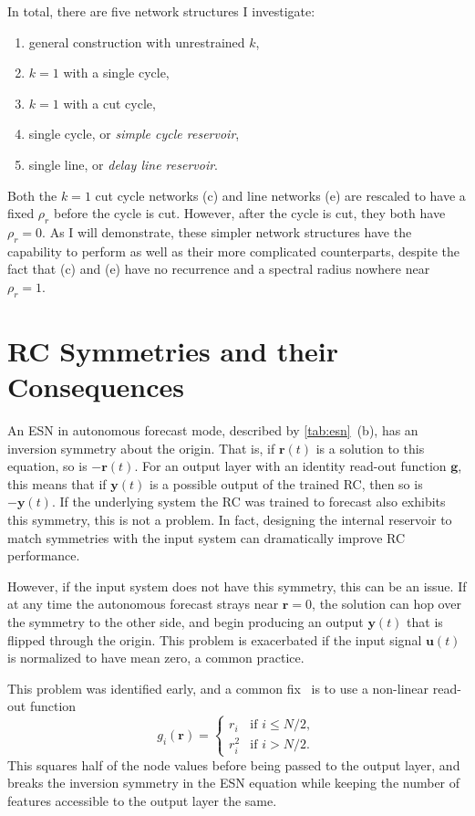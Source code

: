In total, there are five network structures I investigate:
\begin{enumerate}[label= (\alph*)]
\item general construction with unrestrained $k$,
\item $k = 1$ with a single cycle,
\item $k = 1$ with a cut cycle,
\item single cycle, or \emph{simple cycle reservoir},
\item single line, or \emph{delay line reservoir}.
\end{enumerate}
Both the $k = 1$ cut cycle networks (c) and line networks (e) are
rescaled to have a fixed $\rho_r$ before the cycle is cut. However,
after the cycle is cut, they both have $\rho_r=0$. As I will
demonstrate, these simpler network structures have the capability to
perform as well as their more complicated counterparts, despite the
fact that (c) and (e) have no recurrence and a spectral radius nowhere
near $\rho_r = 1$.

\section{RC Symmetries and their Consequences}

An ESN in autonomous forecast mode, described by \cref{tab:esn}~(b),
has an inversion symmetry about the origin. That is, if $\bm{r}(t)$ is
a solution to this equation, so is $-\bm{r}(t)$. For an output layer
with an identity read-out function $\bm{g}$, this means that if
$\bm{y}(t)$ is a possible output of the trained RC, then so is
$-\bm{y}(t)$. If the underlying system the RC was trained to forecast
also exhibits this symmetry, this is not a problem. In fact, designing
the internal reservoir to match symmetries with the input system can
dramatically improve RC performance.~\cite{barbosa2021}

However, if the input system does not have this symmetry, this can be
an issue. If at any time the autonomous forecast strays near $\bm{r} =
0$, the solution can hop over the symmetry to the other side, and
begin producing an output $\bm{y}(t)$ that is flipped through the
origin. This problem is exacerbated if the input signal $\bm{u}(t)$ is
normalized to have mean zero, a common practice.

This problem was identified early, and a common fix~\cite{pathak2017,herteux2020}
is to use a non-linear read-out function
\begin{equation}
  g_i(\bm{r}) = \begin{cases}
    r_i & \text{if } i \leq N / 2, \\
    r_i^2 & \text{if } i > N / 2.
  \end{cases}
  \label{eq:esn-break-sym}
\end{equation}
This squares half of the node values before being passed
to the output layer, and breaks the inversion symmetry in the ESN
equation while keeping the number of features accessible to the output
layer the same.

